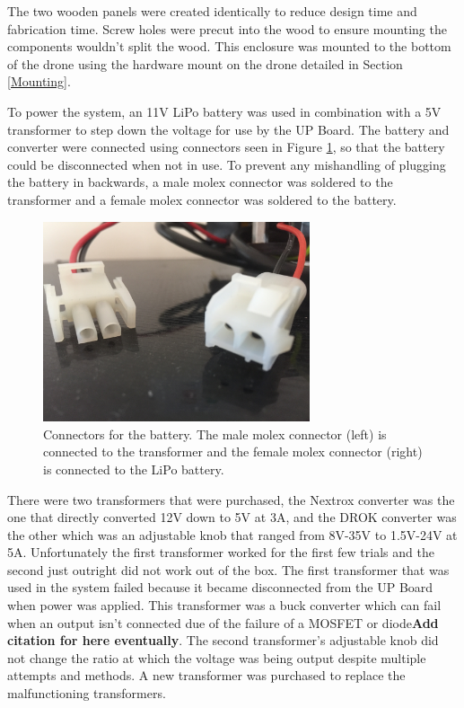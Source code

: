 The two wooden panels were created identically to reduce design time and fabrication time. Screw holes were precut into the wood to ensure mounting the components wouldn't split the wood. This enclosure was mounted to the bottom of the drone using the hardware mount on the drone detailed in Section \ref{Mounting}. \par

To power the system, an 11V LiPo battery was used in combination with a 5V transformer to step down the voltage for use by the UP Board. The battery and converter were connected using connectors seen in Figure \ref{fig:connectors}, so that the battery could be disconnected when not in use. To prevent any mishandling of plugging the battery in backwards, a male molex connector was soldered to the transformer and a female molex connector was soldered to the battery.
\begin{figure}[ht!]
	\centering
	\includegraphics[width=0.70\textwidth]{img/connectors.JPG}
	\caption{Connectors for the battery. The male molex connector (left) is connected to the transformer and the female molex connector (right) is connected to the LiPo battery.}
	\label{fig:connectors}
\end{figure}\par
There were two transformers that were purchased, the Nextrox converter was the one that directly converted 12V down to 5V at 3A, and the DROK converter was the other which was an adjustable knob that ranged from 8V-35V to 1.5V-24V at 5A. Unfortunately the first transformer worked for the first few trials and the second just outright did not work out of the box. The first transformer that was used in the system failed because it became disconnected from the UP Board when power was applied. This transformer was a buck converter which can fail when an output isn't connected due of the failure of a MOSFET or diode\textbf{Add citation for here eventually}. The second transformer's adjustable knob did not change the ratio at which the voltage was being output despite multiple attempts and methods. A new transformer was purchased to replace the malfunctioning transformers. \par

